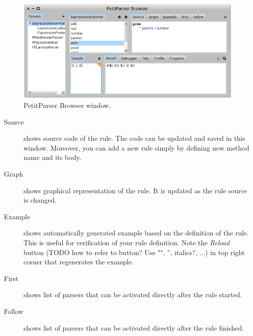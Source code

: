 \documentclass[a4paper,10pt,twoside]{book}
\begin{document}
\begin{figure}
  \begin{center}
    \includegraphics[width=\linewidth]{PPBrowser}
    \caption{PetitParser Browser window. \label{fig:pp/browser}}
  \end{center}
\end{figure}

\begin{description}
	\item [Source] shows source code of the rule. 
		The code can be updated and saved in this window.
		Moreover, you can add a new rule simply by defining new method name and its body.
	\item [Graph]  shows graphical representation of the rule. 
		It is updated as the rule source is changed.
	\item [Example] shows automatically generated example based on the definition of the rule. 
		This is useful for verification of your rule definition.
		Note the \textit{Reload} button (TODO how to refer to button? Use "", '', italics?, ...) in top right corner that regenerates the example.
	\item [First] shows list of parsers that can be activated directly after the rule started.
	\item [Follow] shows list of parsers that can be activated directly after the rule finished.
\end{description}
\end{document}
